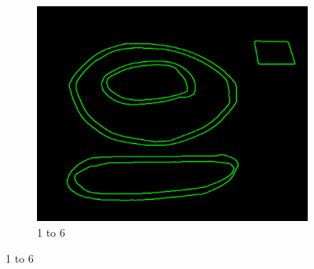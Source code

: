 \documentclass[11pt]{article}
\begin{document}
\begin{figure}
\begin{subfigure}[t]{0.32\textwidth}
		\includegraphics[scale=0.28]{pics/elimination/joinedAfterRemoval6.png}
		\caption{1 to 6}
		\label{construction6}
	\end{subfigure}


\end{figure}
\end{document}
